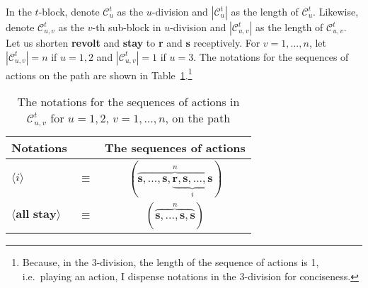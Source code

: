 \documentclass[12pt,letter]{article}
\newcommand{\Kappa}{\mathcal{C}}
\theoremstyle{definition}
\theoremstyle{remark}
\theoremstyle{claim}
\begin{document}

In the $t$-block, denote $\Kappa^t_{u}$ as the $u$-division and $|\Kappa^t_{u} |$ as the length of $\Kappa^t_{u}$. Likewise, denote $\Kappa^t_{u,v}$ as the $v$-th sub-block in $u$-division and $|\Kappa^t_{u,v} |$ as the length of $\Kappa^t_{u,v}$. Let us shorten \textbf{revolt} and \textbf{stay} to \textbf{r} and \textbf{s} receptively. For $v=1,...,n$, let $|\Kappa^t_{u,v}|=n$ if $u=1,2$ and $|\Kappa^t_{u,v}|=1$ if $u=3$. The notations for the sequences of actions on the path are shown in Table~\ref{Table_msg_coordination}.\footnote{Because, in the $3$-division, the length of the sequence of actions is 1, i.e.~playing an action, I dispense notations in the $3$-division for conciseness.}


\begin{table}[!htbp]
\caption{The notations for the sequences of actions in $\Kappa^t_{u,v}$ for $u=1,2$, $v=1,...,n$, on the path}
\label{Table_msg_coordination}
\begin{center}
\begin{tabular}{l c c}
Notations & &The sequences of actions \\
\hline
\hline
$\langle i \rangle$ 				& $\equiv$ 			& $(\overbrace{ \textbf{s},...,\textbf{s},\underbrace{\textbf{r},\textbf{s},...,\textbf{s}}_{i}}^{n} )$  \\
$\langle \textbf{all stay} \rangle$	 					& $\equiv$ 			& $( \overbrace{\textbf{s},...,\textbf{s},{\textbf{s}}}^{n} )$  \\
\hline
\end{tabular}
\end{center}
\end{table}
\end{document}
